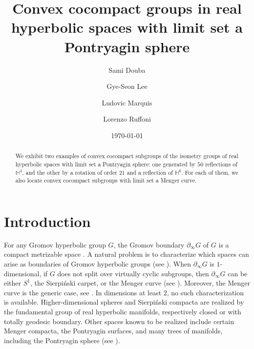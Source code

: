 \documentclass{amsart}
\title[Convex cocompact subgroups with limit set a Pontryagin sphere]{Convex cocompact groups in real hyperbolic spaces with limit set a Pontryagin sphere}
\author{Sami Douba}
\author{Gye-Seon Lee}
\author{Ludovic Marquis}
\author{Lorenzo Ruffoni}
\theoremstyle{plain}
\theoremstyle{definition}
\theoremstyle{remark}
\numberwithin{equation}{section}
\begin{document}
\date{\today}

\begin{abstract}
We exhibit two examples of convex cocompact subgroups of the isometry groups of real hyperbolic spaces with limit set a Pontryagin sphere: one generated by $50$ reflections of $\mathbb{H}^4$, and the other by a rotation of order $21$ and a reflection of $\mathbb{H}^6$. For each of them, we also locate convex cocompact subgroups  with limit set a Menger curve.
\end{abstract}


\maketitle


\section{Introduction}

For any Gromov hyperbolic group $G$, the Gromov boundary $\partial_\infty G$ of $G$ is a compact metrizable space \cite{G87}. A natural problem is to characterize which spaces can arise as boundaries of Gromov hyperbolic groups (see \cite[Question A]{KK00}). 
When $\partial_\infty G$ is $1$-dimensional, if $G$ does not split over virtually cyclic subgroups, then $\partial_\infty G$ can be either $S^1$, the Sierpi\'nski carpet, or the Menger curve (see \cite[Theorem 4]{KK00}). Moreover, the Menger curve is the generic case, see \cite{CH95}.
In dimensions at least $2$, no such characterization is available. 
Higher-dimensional spheres and Sierpi\'nski compacta are realized by the fundamental group of real hyperbolic manifolds, respectively closed or with totally geodesic boundary. Other spaces known to be realized include certain Menger compacta, the Pontryagin surfaces, and many trees of manifolds, including the Pontryagin sphere (see \cite{DR99,FI03,DO07,PS09,SW20}).
\end{document}

